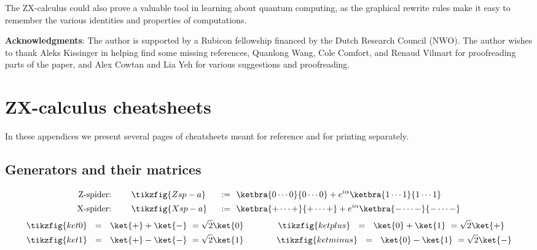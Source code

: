 \documentclass[a4paper,onecolumn,superscriptaddress,11pt,%
				unpublished,%
				allowfontchageintitle,%
				]{quantumarticle}
\begin{document}
The ZX-calculus could also prove a valuable tool in learning about quantum computing, as the graphical rewrite rules make it easy to remember the various identities and properties of computations.

\medskip
\noindent\textbf{Acknowledgments}: The author is supported by a Rubicon fellowship financed by the Dutch Research Council (NWO). The author wishes to thank Aleks Kissinger in helping find some missing references, Quanlong Wang, Cole Comfort, and Renaud Vilmart for proofreading parts of the paper, and Alex Cowtan and Lia Yeh for various suggestions and proofreading.


{}




\appendix



\clearpage
\section{ZX-calculus cheatsheets}
In these appendices we present several pages of cheatsheets meant for reference and for printing separately.

\subsection{Generators and their matrices}

\begin{align*}
\text{Z-spider:}& \ \ \ \ \quad \tikzfig{Zsp-a} \ \ &:=&\ \ \ketbra{0 \cdots 0}{0 \cdots 0} + e^{i \alpha} \ketbra{1 \cdots 1}{1 \cdots 1} \\
\text{X-spider:}& \ \ \ \ \quad \tikzfig{Xsp-a} \ \ &:=&\ \ \ketbra{+ \cdots +}{+ \cdots +} + e^{i \alpha} \ketbra{- \cdots -}{- \cdots -}
\end{align*}
\begin{align*}
\tikzfig{ket0}\ \ &=\ \ \ket{+} + \ket{-} \ = \sqrt{2}\ket{0}
\qquad\qquad
\tikzfig{ketplus}\ \ =\ \ \ket{0} + \ket{1} \ = \sqrt{2}\ket{+} \\
\tikzfig{ket1}\ \ &=\ \ \ket{+} - \ket{-} \ = \sqrt{2}\ket{1}
\qquad\qquad\!
\tikzfig{ketminus}\ \ =\ \ \ket{0} - \ket{1} \ = \sqrt{2}\ket{-}
\end{align*}
\end{document}
